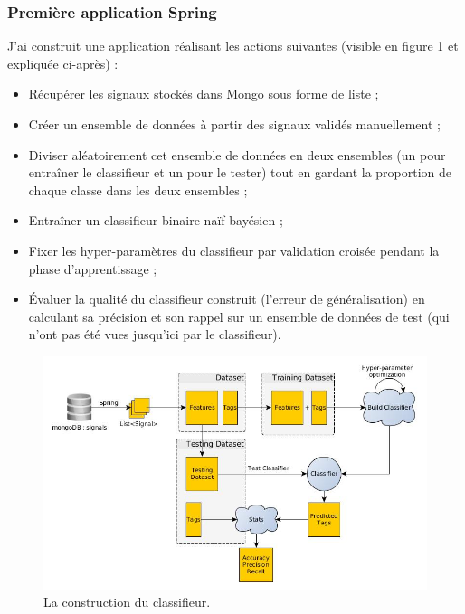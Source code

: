             \subsubsection{Première application Spring}
                J'ai construit une application réalisant les actions suivantes (visible en figure \ref{fig:classif_building} et expliquée ci-après) :
            \begin{itemize}
                \item Récupérer les signaux stockés dans Mongo sous forme de liste ;
                \item Créer un ensemble de données à partir des signaux validés manuellement ;
                \item Diviser aléatoirement cet ensemble de données en deux ensembles (un pour entraîner le classifieur et un pour le tester) tout en gardant la proportion de chaque classe dans les deux ensembles ;
                \item Entraîner un classifieur binaire naïf bayésien ;
                \item Fixer les hyper-paramètres du classifieur par validation croisée pendant la phase d'apprentissage ;
                \item Évaluer la qualité du classifieur construit (l'erreur de généralisation) en calculant sa précision et son rappel sur un ensemble de données de test (qui n'ont pas \og été vues \fg jusqu'ici par le classifieur).
            \end{itemize}

            \begin{figure}[h!]
                \centering
                \includegraphics[width=\textwidth]{images/classifier_building.jpg}
                \caption{La construction du classifieur.}
                \label{fig:classif_building}
            \end{figure}

